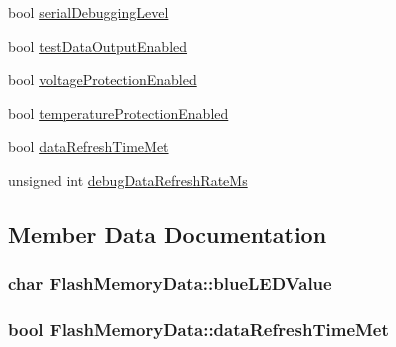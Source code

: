 \begin{DoxyCompactItemize}
\item 
bool \hyperlink{structFlashMemoryData_a59ac51257a62821b13f8df0d21b86135}{serial\+Debugging\+Level}
\item 
bool \hyperlink{structFlashMemoryData_adcf63c0ba25e843a3e2e0e0f1bcad4e8}{test\+Data\+Output\+Enabled}
\item 
bool \hyperlink{structFlashMemoryData_a3b5553fc5eb53805c6f10a7c1a80dd83}{voltage\+Protection\+Enabled}
\item 
bool \hyperlink{structFlashMemoryData_aede7cdfaeb691f39ff50b350d1e0b3b9}{temperature\+Protection\+Enabled}
\item 
bool \hyperlink{structFlashMemoryData_aa5ccce295f4c2cf838962fbfca9ee9a9}{data\+Refresh\+Time\+Met}
\item 
unsigned int \hyperlink{structFlashMemoryData_a25f722ef2d2742bc8881ae5164af3c04}{debug\+Data\+Refresh\+Rate\+Ms}
\end{DoxyCompactItemize}


\subsection{Member Data Documentation}
\subsubsection[{\texorpdfstring{blue\+L\+E\+D\+Value}{blueLEDValue}}]{\setlength{\rightskip}{0pt plus 5cm}char Flash\+Memory\+Data\+::blue\+L\+E\+D\+Value}\hypertarget{structFlashMemoryData_a740528a2ae1beb940f4f3286c4a31438}{}\label{structFlashMemoryData_a740528a2ae1beb940f4f3286c4a31438}
\subsubsection[{\texorpdfstring{data\+Refresh\+Time\+Met}{dataRefreshTimeMet}}]{\setlength{\rightskip}{0pt plus 5cm}bool Flash\+Memory\+Data\+::data\+Refresh\+Time\+Met}\hypertarget{structFlashMemoryData_aa5ccce295f4c2cf838962fbfca9ee9a9}{}\label{structFlashMemoryData_aa5ccce295f4c2cf838962fbfca9ee9a9}
